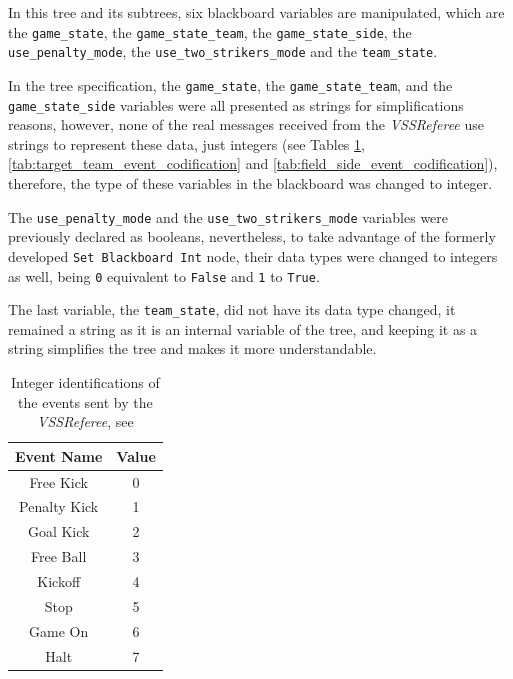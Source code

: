 In this tree and its subtrees, six blackboard variables are manipulated, which are the \texttt{game\_state}, the \texttt{game\_state\_team}, the \texttt{game\_state\_side}, the \texttt{use\_penalty\_mode}, the \texttt{use\_two\_strikers\_mode} and the \texttt{team\_state}.

In the tree specification, the \texttt{game\_state}, the \texttt{game\_state\_team}, and the \texttt{game\_state\_side} variables were all presented as strings for simplifications reasons, however, none of the real messages received from the \textit{VSSReferee} use strings to represent these data, just integers (see Tables \ref{tab:referee_events_ids}, \ref{tab:target_team_event_codification} and \ref{tab:field_side_event_codification}), therefore, the type of these variables in the blackboard was changed to integer.

The \texttt{use\_penalty\_mode} and the \texttt{use\_two\_strikers\_mode} variables were previously declared as booleans, nevertheless, to take advantage of the formerly developed \texttt{Set Blackboard Int} node, their data types were changed to integers as well, being \texttt{0} equivalent to \texttt{False} and \texttt{1} to \texttt{True}.

The last variable, the \texttt{team\_state}, did not have its data type changed, it remained a string as it is an internal variable of the tree, and keeping it as a string simplifies the tree and makes it more understandable.

\begin{table}[!htbp]
    \centering
    \begin{tabular}{c c}
        \toprule
        Event Name   & Value \\
        \midrule
        Free Kick    & 0     \\
        Penalty Kick & 1     \\
        Goal Kick    & 2     \\
        Free Ball    & 3     \\
        Kickoff      & 4     \\
        Stop         & 5     \\
        Game On      & 6     \\
        Halt         & 7     \\
        \bottomrule
    \end{tabular}
    \caption{Integer identifications of the events sent by the \textit{VSSReferee}, see \cite{VSSProto}}
    \label{tab:referee_events_ids}
\end{table}

